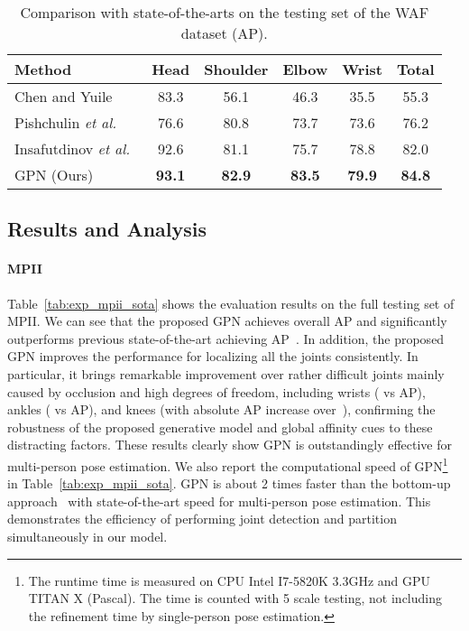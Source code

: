 \documentclass[10pt,twocolumn,letterpaper]{article}
\begin{document}
\begin{table}[t!]\footnotesize
  \caption{Comparison with state-of-the-arts on the testing set of the WAF dataset (AP).}
  \label{tab:exp_waf_sota}
  \centering
  \setlength{\tabcolsep}{5pt}
  \begin{tabular}{lccccc}
    \toprule
    Method   &Head & Shoulder & Elbow & Wrist & Total\\
    \midrule
    Chen and Yuile~\cite{chen2015parsing} & 83.3 & 56.1 & 46.3 & 35.5 & 55.3 \\
    Pishchulin \emph{et al.}~\cite{hpe:deepcut_cvpr16} & 76.6 & 80.8 & 73.7 & 73.6 & 76.2 \\
    Insafutdinov \emph{et al.}~\cite{hpe:deepercut_eccv16} & 92.6 & 81.1 & 75.7 & 78.8 & 82.0 \\
    \midrule
    GPN (Ours) & \textbf{93.1} & \textbf{82.9} & \textbf{83.5} & \textbf{79.9} & \textbf{84.8}\\
    \bottomrule
  \end{tabular}
\end{table}



\subsection{Results and Analysis}

\paragraph{MPII} Table~\ref{tab:exp_mpii_sota} shows the evaluation results on the full testing set of MPII. We can see that the proposed GPN achieves overall  AP and significantly outperforms previous state-of-the-art achieving  AP~\cite{newell2016associative}. In addition, the proposed GPN improves the performance for localizing all the joints consistently. In particular, it brings remarkable improvement over rather difficult joints mainly caused by occlusion and high degrees of freedom, including wrists ( vs  AP), ankles ( vs  AP), and knees (with absolute  AP increase over~\cite{newell2016associative}), confirming the robustness of the proposed generative model and global affinity cues to these distracting factors. These results clearly show  GPN is outstandingly effective for multi-person pose estimation. We also report the computational speed of GPN\footnote{The runtime time is measured on CPU Intel I7-5820K 3.3GHz and GPU TITAN X (Pascal). The time is counted with 5 scale testing, not including the refinement time by single-person pose estimation.}   in Table~\ref{tab:exp_mpii_sota}.  GPN is about 2 times faster than the bottom-up approach~\cite{cao2017realtime} with state-of-the-art speed for multi-person pose estimation.
This demonstrates the efficiency of performing joint detection and partition simultaneously in our model.
\end{document}
